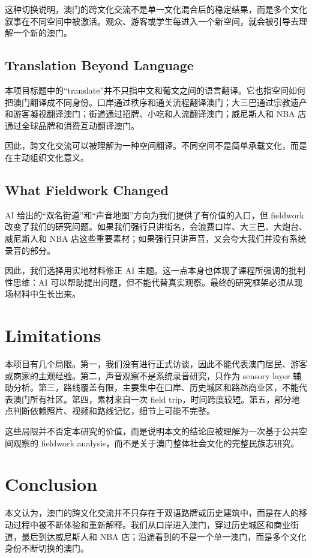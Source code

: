 \documentclass[12pt,a4paper]{article}
\begin{document}
这种切换说明，澳门的跨文化交流不是单一文化混合后的稳定结果，而是多个文化叙事在不同空间中被激活。观众、游客或学生每进入一个新空间，就会被引导去理解一个新的澳门。

\subsection{Translation Beyond Language}

本项目标题中的“translate”并不只指中文和葡文之间的语言翻译。它也指空间如何把澳门翻译成不同身份。口岸通过秩序和通关流程翻译澳门；大三巴通过宗教遗产和游客凝视翻译澳门；街道通过招牌、小吃和人流翻译澳门；威尼斯人和 NBA 店通过全球品牌和消费互动翻译澳门。

因此，跨文化交流可以被理解为一种空间翻译。不同空间不是简单承载文化，而是在主动组织文化意义。

\subsection{What Fieldwork Changed}

AI 给出的“双名街道”和“声音地图”方向为我们提供了有价值的入口，但 fieldwork 改变了我们的研究问题。如果我们强行只讲街名，会浪费口岸、大三巴、大炮台、威尼斯人和 NBA 店这些重要素材；如果强行只讲声音，又会夸大我们并没有系统录音的部分。

因此，我们选择用实地材料修正 AI 主题。这一点本身也体现了课程所强调的批判性思维：AI 可以帮助提出问题，但不能代替真实观察。最终的研究框架必须从现场材料中生长出来。

\section{Limitations}

本项目有几个局限。第一，我们没有进行正式访谈，因此不能代表澳门居民、游客或商家的主观经验。第二，声音观察不是系统录音研究，只作为 sensory layer 辅助分析。第三，路线覆盖有限，主要集中在口岸、历史城区和路氹商业区，不能代表澳门所有社区。第四，素材来自一次 field trip，时间跨度较短。第五，部分地点判断依赖照片、视频和路线记忆，细节上可能不完整。

这些局限并不否定本研究的价值，而是说明本文的结论应被理解为一次基于公共空间观察的 fieldwork analysis，而不是关于澳门整体社会文化的完整民族志研究。

\section{Conclusion}

本文认为，澳门的跨文化交流并不只存在于双语路牌或历史建筑中，而是在人的移动过程中被不断体验和重新解释。我们从口岸进入澳门，穿过历史城区和商业街道，最后到达威尼斯人和 NBA 店；沿途看到的不是一个单一澳门，而是多个文化身份不断切换的澳门。
\end{document}

